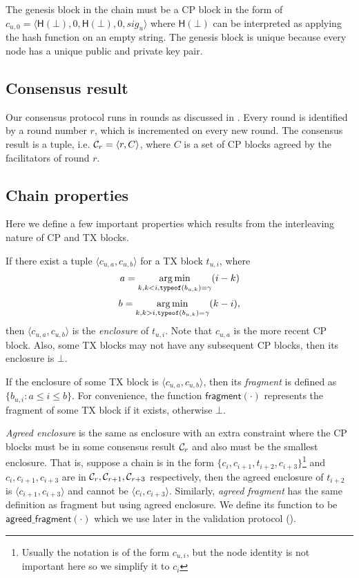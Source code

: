 The genesis block in the chain must be a CP block in the form of
$c_{u, 0} = \langle \textsf{H}(\bot), 0,  \textsf{H}(\bot), 0, sig_u \rangle$
where $\textsf{H}(\bot)$ can be interpreted as applying the hash function on an empty string.
The genesis block is unique because every node has a unique public and private key pair.


\subsection{Consensus result}
\label{sec:consensus-result}
Our consensus protocol runs in rounds as discussed in .
Every round is identified by a round number $r$, which is incremented on every new round.
The consensus result is a tuple, i.e. $\mathcal{C}_r = \langle r, C \rangle$,
where $C$ is a set of CP blocks agreed by the facilitators of round $r$.

\subsection{Chain properties}
Here we define a few important properties which results from the interleaving nature of CP and TX blocks.

If there exist a tuple $\langle c_{u,a}, c_{u, b} \rangle$ for a TX block $t_{u, i}$,
where 
$$a = \operatorname*{arg\,min}_{k, k < i, \texttt{typeof}(b_{u,k}) = \gamma}(i - k)$$
$$b = \operatorname*{arg\,min}_{k, k > i, \texttt{typeof}(b_{u,k}) = \gamma}(k - i),$$
then $\langle c_{u,a}, c_{u, b} \rangle$ is the \emph{enclosure} of $t_{u, i}$.
Note that $c_{u, a}$ is the more recent CP block.
Also, some TX blocks may not have any subsequent CP blocks, then its enclosure is $\bot$.

If the enclosure of some TX block is $\langle c_{u,a}, c_{u, b} \rangle$,
then its \emph{fragment} is defined as $\{ b_{u, i} : a \le i \le b \}$.
For convenience, the function $\textsf{fragment}(\cdot)$ represents the fragment of some TX block if it exists, otherwise $\bot$.

\emph{Agreed enclosure} is the same as enclosure with an extra constraint where the CP blocks must be in some consensus result $\mathcal{C}_r$ and also must be the smallest enclosure.
That is, suppose a chain is in the form
    $\{c_{i}, c_{i+1}, t_{i+2}, c_{i+3}\}$\footnote{Usually the notation is of the form $c_{u, i}$, but the node identity is not important here so we simplify it to $c_{i}$}
    and $c_{i}, c_{i+1}, c_{i+3}$ are in $\mathcal{C}_r, \mathcal{C}_{r+1}, \mathcal{C}_{r+3}$ respectively,
    then the agreed enclosure of $t_{i+2}$ is $\langle c_{i+1}, c_{i+3}\rangle$ and cannot be $\langle c_{i}, c_{i+3}\rangle$.
Similarly, \emph{agreed fragment} has the same definition as fragment but using agreed enclosure.
We define its function to be $\textsf{agreed\_fragment}(\cdot)$ which we use later in the validation protocol ().

